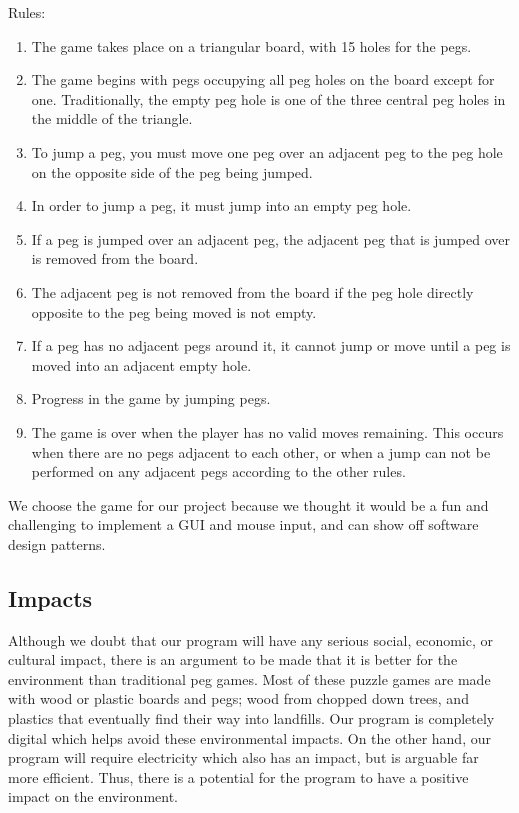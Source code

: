 \documentclass[10pt,conference,onecolumn,compsoc]{IEEEtran}
\begin{document}
Rules:
\begin{enumerate}
\item The game takes place on a triangular board, with 15 holes for the pegs.
\item The game begins with pegs occupying all peg holes on the board except for one. Traditionally, the empty peg hole is one of the three central peg holes in the middle of the triangle.
\item To jump a peg, you must move one peg over an adjacent peg to the peg hole on the opposite side of the peg being jumped.
\item In order to jump a peg, it must jump into an empty peg hole.
\item If a peg is jumped over an adjacent peg, the adjacent peg that is jumped over is removed from the board.
\item The adjacent peg is not removed from the board if the peg hole directly opposite to the peg being moved is not empty.
\item If a peg has no adjacent pegs around it, it cannot jump or move until a peg is moved into an adjacent empty hole.
\item Progress in the game by jumping pegs.
\item The game is over when the player has no valid moves remaining. This occurs when there are no pegs adjacent to each other, or when a jump can not be performed on any adjacent pegs according to the other rules.
\end{enumerate}

We choose the game for our project because we thought it would be a fun and challenging to implement a GUI	 and mouse input, and can show off software design patterns.


\subsection{Impacts}
Although we doubt that our program will have any serious social, economic, or cultural impact, there is an argument to be made that it is better for the environment than traditional peg games. Most of these puzzle games are made with wood or plastic boards and pegs; wood from chopped down trees, and plastics that eventually find their way into landfills. Our program is completely digital which helps avoid these environmental impacts. On the other hand, our program will require electricity which also has an impact, but is arguable far more efficient. Thus, there is a potential for the program to have a positive impact on the environment.
\end{document}
